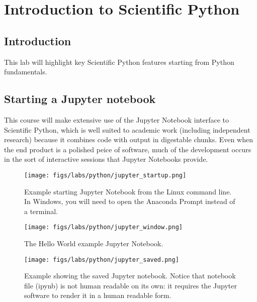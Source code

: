 \chapter{Introduction to Scientific Python}

\section{Introduction}

This lab will highlight key Scientific Python features starting from
Python fundamentals.

\section{Starting a Jupyter notebook}

This course will make extensive use of the Jupyter Notebook interface
to Scientific Python, which is well suited to academic work (including
independent research) because it combines code with output in
digestable chunks.  Even when the end product is a polished peice of
software, much of the development occurs in the sort of interactive
sessions that Jupyter Notebooks provide.  

\begin{figure}[htbp]
\begin{center}
\texttt{[image: figs/labs/python/jupyter\_startup.png]} 
\caption{Example starting Jupyter Notebook from the Linux command line.  In Windows, you will need to open the Anaconda Prompt instead of a terminal.}
\label{fig:jupyterstartup}
\end{center}
\end{figure}

\begin{figure}[htbp]
\begin{center}
\texttt{[image: figs/labs/python/jupyter\_window.png]} 
\caption{The Hello World example Jupyter Notebook.}
\label{fig:jupyterwindow}
\end{center}
\end{figure}

\begin{figure}[htbp]
\begin{center}
\texttt{[image: figs/labs/python/jupyter\_saved.png]} 
\caption{Example showing the saved Jupyter notebook.  Notice that notebook file (ipynb) is not human readable on its own: it requires the Jupyter software to render it in a human readable form.}
\label{fig:jupytersaved}
\end{center}
\end{figure}

